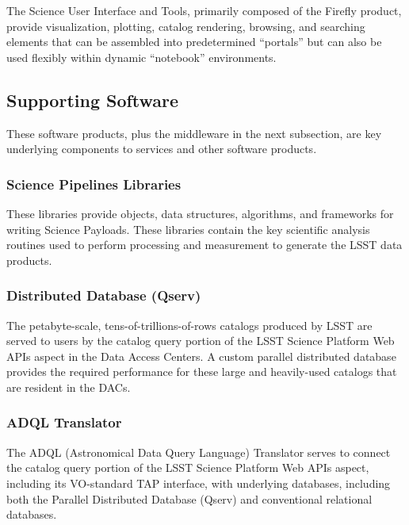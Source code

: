 \documentclass[DM,toc,lsstdraft]{lsstdoc}
\begin{document}
The Science User Interface and Tools, primarily composed of the Firefly product, provide visualization, plotting,
catalog rendering, browsing, and searching elements that can be
assembled into predetermined ``portals'' but can also be used flexibly
within dynamic ``notebook'' environments.

\subsection{Supporting Software}\label{supporting-software}

These software products, plus the middleware in the next subsection, are key underlying components to services and other software products.

\subsubsection{Science Pipelines Libraries}\label{science-pipelines-libraries}

These libraries provide objects, data structures, algorithms, and frameworks for writing Science Payloads.
These libraries contain the key scientific analysis routines used to perform processing and measurement to generate the LSST data products.

\subsubsection{Distributed Database
(Qserv)}\label{distributed-database-qserv}

The petabyte-scale, tens-of-trillions-of-rows catalogs produced by LSST are served to users by the catalog query portion of the LSST Science Platform Web APIs aspect in the Data Access Centers.
A custom parallel distributed database provides the required performance for these large and heavily-used catalogs that are resident in the DACs.

\subsubsection{ADQL Translator}\label{adql-translator}

The ADQL (Astronomical Data Query Language) Translator serves to connect the catalog query portion of the LSST Science Platform Web APIs aspect, including its VO-standard TAP interface, with underlying databases, including both the Parallel Distributed Database (Qserv) and conventional relational databases.
\end{document}
